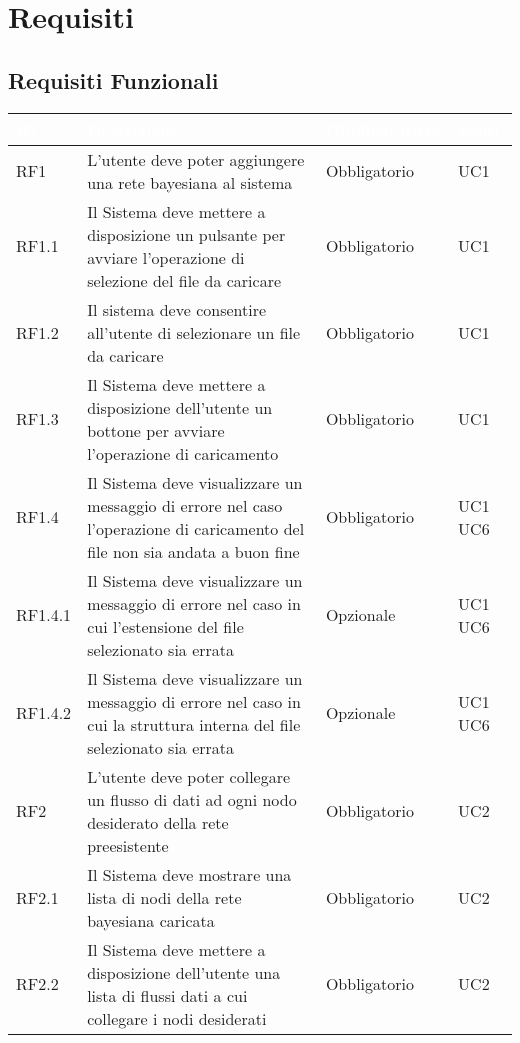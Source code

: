 \section{Requisiti}\label{Requisiti}

\subsection{Requisiti Funzionali}\label{RF}
\begin{center}
\begin{longtable}[c]{|m{}|m{}|m{}|m{}|}
\hline
\rowcolor{bluelogo}\textbf{\textcolor{white}{ID}} & \textbf{\textcolor{white}{Descrizione}} & \textbf{\textcolor{white}{Obbligatorietà}} & \textbf{\textcolor{white}{Fonti}}\\
\hline \hline
\endfirsthead
RF1 & L'utente deve poter aggiungere una rete bayesiana al sistema & Obbligatorio & UC1\\
\hline
\rowcolor{grigio}RF1.1 & Il Sistema deve mettere a disposizione un pulsante per avviare l'operazione di selezione del file da caricare & Obbligatorio & UC1\\
\hline
RF1.2 & Il sistema deve consentire all'utente di selezionare un file da caricare & Obbligatorio & UC1\\
\hline
\rowcolor{grigio}RF1.3 & Il Sistema deve mettere a disposizione dell'utente un bottone per avviare l'operazione di caricamento & Obbligatorio & UC1\\
\hline
RF1.4 & Il Sistema deve visualizzare un messaggio di errore nel caso l'operazione di caricamento del file non sia andata a buon fine & Obbligatorio & UC1 UC6\\
\hline
\rowcolor{grigio}RF1.4.1 & Il Sistema deve visualizzare un messaggio di errore nel caso in cui l'estensione del file selezionato sia errata & Opzionale & UC1 UC6\\
\hline
RF1.4.2 & Il Sistema deve visualizzare un messaggio di errore nel caso in cui la struttura interna del file selezionato sia errata & Opzionale & UC1 UC6\\
\hline
\rowcolor{grigio}RF2 & L'utente deve poter collegare un flusso di dati ad ogni nodo desiderato della rete preesistente & Obbligatorio & UC2\\
\hline
RF2.1 & Il Sistema deve mostrare una lista di nodi della rete bayesiana caricata & Obbligatorio & UC2\\
\hline
\rowcolor{grigio}RF2.2 & Il Sistema deve mettere a disposizione dell'utente una lista di flussi dati a cui collegare i nodi desiderati & Obbligatorio & UC2\\

\end{longtable}
\end{center}

